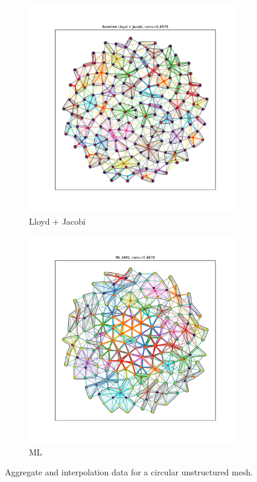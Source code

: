 \documentclass{article}
\begin{document}
\begin{figure}[h]
  \centering
  \begin{subfigure}[t]{0.49\textwidth}
    \centering
    \includegraphics[width=\textwidth]{grid_circle_lloyd.pdf}
    \caption{Lloyd + Jacobi}
  \end{subfigure}
  \begin{subfigure}[t]{0.49\textwidth}
    \centering
    \includegraphics[width=\textwidth]{grid_circle_ml.pdf}
    \caption{ML}
  \end{subfigure}
  \caption{Aggregate and interpolation data for a circular unstructured mesh.}
  \label{fig:gridcircle}
\end{figure}
\end{document}
